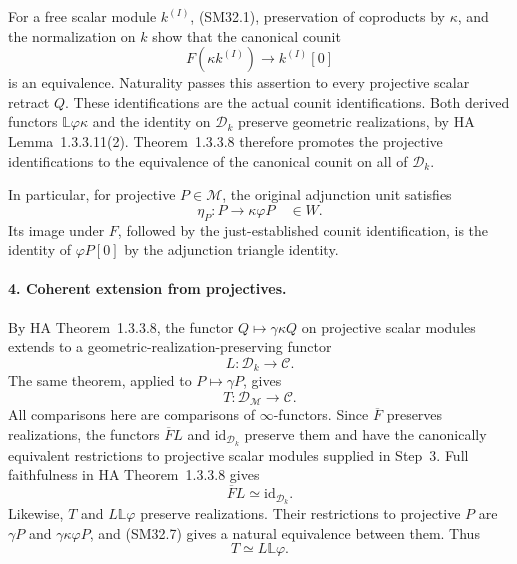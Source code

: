 For a free scalar module \(k^{(I)}\), (SM32.1), preservation
of coproducts by \(\kappa\), and the normalization on \(k\)
show that the canonical counit
\[
          F(\kappa k^{(I)})\longrightarrow k^{(I)}[0]
\]
is an equivalence.  Naturality passes this assertion to every
projective scalar retract \(Q\).  These identifications are
the actual counit identifications.  Both derived functors
\(\mathbb L\varphi\kappa\) and the identity on
\(\mathcal D_k\) preserve geometric realizations, by HA
Lemma~1.3.3.11(2).  Theorem~1.3.3.8 therefore promotes the
projective identifications to the equivalence of the canonical
counit on all of \(\mathcal D_k\).

In particular, for projective \(P\in\mathcal M\), the original
adjunction unit satisfies
\[
                 \eta_P:P\longrightarrow\kappa\varphi P
                            \quad\in W.                       \tag{SM32.7}
\]
Its image under \(F\), followed by the just-established
counit identification, is the identity of \(\varphi P[0]\)
by the adjunction triangle identity.

\paragraph{4. Coherent extension from projectives.}
By HA Theorem~1.3.3.8, the functor
\(Q\mapsto\gamma\kappa Q\) on projective scalar modules
extends to a geometric-realization-preserving functor
\[
                         L:\mathcal D_k\longrightarrow\mathcal C.
                                                               \tag{SM32.8}
\]
The same theorem, applied to \(P\mapsto\gamma P\), gives
\[
                    T:\mathcal D_{\mathcal M}\longrightarrow\mathcal C.
                                                               \tag{SM32.9}
\]
All comparisons here are comparisons of \(\infty\)-functors.
Since \(\overline F\) preserves realizations, the functors
\(\overline F L\) and \(\mathrm{id}_{\mathcal D_k}\)
preserve them and have the canonically equivalent restrictions
to projective scalar modules supplied in Step~3.
Full faithfulness in HA Theorem~1.3.3.8 gives
\[
                      \overline F L\simeq\mathrm{id}_{\mathcal D_k}.
                                                               \tag{SM32.10}
\]
Likewise, \(T\) and \(L\mathbb L\varphi\) preserve
realizations.  Their restrictions to projective \(P\) are
\(\gamma P\) and \(\gamma\kappa\varphi P\), and (SM32.7)
gives a natural equivalence between them.  Thus
\[
                             T\simeq L\mathbb L\varphi.       \tag{SM32.11}
\]


